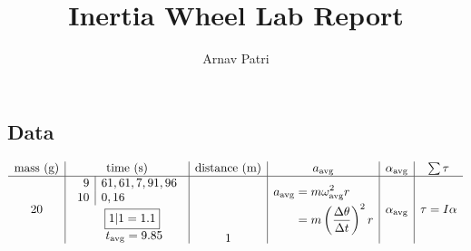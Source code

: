 \documentclass[12pt, A4]{article}
\title{Inertia Wheel Lab Report}
\author{Arnav Patri}
\newcommand{\avg}[1]{#1_{\mathrm{avg}}}
\begin{document}
	\maketitle
	
	\subsection*{Data}
		\[\begin{array}{c|c|c|c|c|c}
			\text{mass (g)} & \text{time (s)} & \text{distance (m)} & \avg{a} & \avg{\alpha} & \sum\tau \\\hline
			20 & 
				{\begin{align*}
					&\begin{array}{r|l}
						9 & 61, 61, 7, 91, 96 \\
						10 & 0, 16 
						\end{array} \\
					&\hspace{7.2mm}\begin{array}{c} 
						\boxed{1|1 = 1.1} \\ 
						\hspace{1.1mm}\avg{t} = 9.85 
					\end{array}
				\end{align*}} &
				\multirow{5}{*}{1} &
				{\begin{align*}
					\avg{a} &= m\avg{\omega}^2r \\
					&= m\left(\frac{\Delta\theta}{\Delta t}\right)^2r
				\end{align*}} &
				\avg{\alpha} &
				\tau = I\alpha
		\end{array}\]
\end{document}
